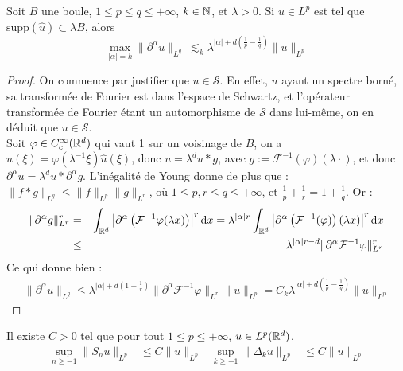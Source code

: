 \documentclass[11pt,a4paper]{article}
\begin{document}
\begin{lemma}
Soit $B$ une boule, $1\leq p  \leq  q \leq +\infty$, $k\in \mathbb N$, et $\lambda >0$. Si $u\in L^p$ est tel que $\text{supp}(\hat{u})\subset \lambda B$, alors
\begin{equation}\label{bernstein}
\max_{|\alpha|=k}{\| \partial^\alpha u\|_{L^q}} \ \lesssim_k \lambda^{|\alpha| +d \left ( \frac{1}{p}- \frac{1}{q} \right )}\|u\|_{L^p}
\end{equation}
\end{lemma}

\begin{proof}
On commence par justifier que $u\in \mathcal{S}$. En effet, $u$ ayant un spectre borné, sa transformée de Fourier est dans l'espace de Schwartz, et l'opérateur transformée de Fourier étant un automorphisme de $\mathcal{S}$ dans lui-même, on en déduit que $u\in \mathcal{S}$. \\
Soit $\varphi \in C^\infty_c(\mathbb R^d)$ qui vaut 1 sur un voisinage de $B$, on a $\hat{u}(\xi)=\varphi(\lambda^{-1}\xi)\hat{u}(\xi)$, donc $u=\lambda^d u * g$, avec $g := \mathcal{F}^{-1}(\varphi)(\lambda \cdot)$, et donc $\partial^\alpha u =\lambda^d u * \partial^\alpha g$. L'inégalité de Young donne de plus que : $\|f * g \|_{L^q} \leq \|f\|_{L^p} \|g\|_{L^r}$, où $1\leq p,r\leq q \leq +\infty$, et $\frac{1}{p}+\frac{1}{r}= 1 + \frac{1}{q}$. Or :
\begin{eqnarray*}
\| \partial^\alpha g \|^r_{L^r} &=& \int_{\mathbb R^d} \left | \partial^\alpha \left(\mathcal{F}^{-1} \varphi(\lambda x)\right) \right |^r \mathrm{d}x =   \lambda^{|\alpha|r} \int_{\mathbb R^d} \left | \partial^\alpha \left(\mathcal{F}^{-1}(\varphi)\right)(\lambda x) \right |^r \mathrm{d}x  \\
&\leq& \lambda^{|\alpha|r-d} \| \partial^\alpha \mathcal{F}^{-1}\varphi \|^r_{L^r}
\end{eqnarray*}
Ce qui donne bien :
\begin{eqnarray*}
\| \partial^\alpha u \|_{L^q} \leq \lambda^{|\alpha| + d(1-\frac{1}{r})} \| \partial^\alpha \mathcal{F}^{-1}\varphi \|_{L^r} \|u\|_{L^p} = C_k\lambda^{|\alpha| + d(\frac{1}{p}-\frac{1}{q})} \|u\|_{L^p}
\end{eqnarray*}
\end{proof}


\begin{lemma}\label{young}
Il existe $C>0$ tel que pour tout $1\leq p \leq +\infty$, $u \in L^p(\mathbb R^d)$, 
\begin{align*}
\sup_{n\geq -1}\|S_nu\|_{L^p} &\leq C \|u\|_{L^p} & \sup_{k\geq -1}\|\Delta_ku\|_{L^p} &\leq C \|u\|_{L^p}
\end{align*}
\end{lemma}
\end{document}
